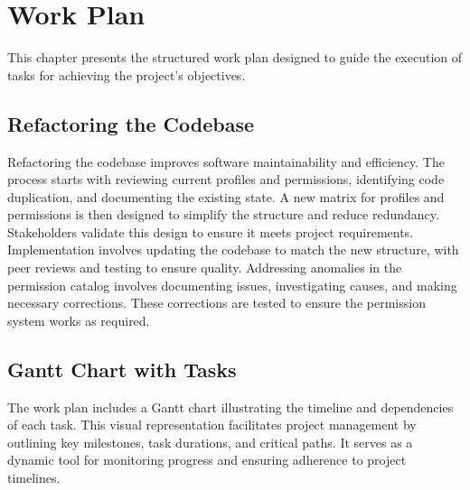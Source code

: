 %

\chapter{Work Plan}
\label{Work Plan}

This chapter presents the structured work plan designed to guide the execution of tasks for achieving the project's objectives.

\section{Refactoring the Codebase}

Refactoring the codebase improves software maintainability and efficiency. The process starts with reviewing current profiles and permissions, identifying code duplication, and documenting the existing state. A new matrix for profiles and permissions is then designed to simplify the structure and reduce redundancy. Stakeholders validate this design to ensure it meets project requirements. Implementation involves updating the codebase to match the new structure, with peer reviews and testing to ensure quality. Addressing anomalies in the permission catalog involves documenting issues, investigating causes, and making necessary corrections. These corrections are tested to ensure the permission system works as required.

\section{Gantt Chart with Tasks}

The work plan includes a Gantt chart illustrating the timeline and dependencies of each task. This visual representation facilitates project management by outlining key milestones, task durations, and critical paths. It serves as a dynamic tool for monitoring progress and ensuring adherence to project timelines.

